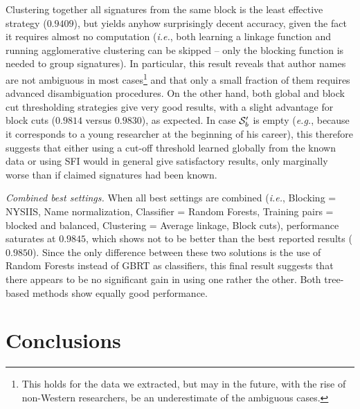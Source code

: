 \documentclass{article}
\newcommand{\ie}{\emph{i.e.}\xspace}
\newcommand{\eg}{\emph{e.g.}\xspace}
\begin{document}
Clustering together all signatures from the same block is the least effective
strategy ($0.9409$), but yields anyhow surprisingly decent accuracy, given the
fact it requires almost no computation (\ie, both learning a linkage function
and running agglomerative clustering can be skipped -- only the blocking
function is needed to group signatures). In particular, this result reveals
that author names are not ambiguous in most cases\footnote{This holds for the
data we extracted, but may in the future, with the rise of non-Western
researchers, be an underestimate of the ambiguous cases.} and that only a small
fraction of them requires advanced disambiguation procedures. On the other
hand, both global and block cut thresholding strategies give very good results,
with a slight advantage for block cuts ($0.9814$ versus $0.9830$), as expected.
In case ${\cal S}^\prime_b$ is empty (\eg, because it corresponds to a young
researcher at the beginning of his career), this therefore suggests that either using
a cut-off threshold learned globally from the known data or using SFI would in general give
satisfactory results, only marginally worse than if claimed signatures had been
known.

\textit{Combined best settings.} When all best settings are combined (\ie,
Blocking = NYSIIS, Name normalization, Classifier = Random Forests, Training
pairs = blocked and balanced, Clustering = Average linkage, Block cuts),
performance saturates at $0.9845$, which shows not to be better than the best
reported results ($0.9850$). Since the only difference between these two
solutions is the use of Random Forests instead of GBRT as classifiers, this
final result suggests that there appears to be no significant gain in using one rather
the other. Both tree-based methods show equally good performance.



\section{Conclusions}
\label{conclusions}
\end{document}
